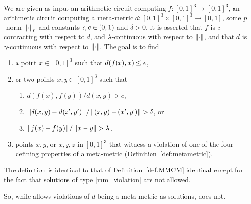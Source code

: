 \begin{definition}[\MMCM]
\label{def:MMCM}
We are given as input an arithmetic circuit computing $f: [0,1]^3\to [0,1]^3$,
an arithmetic circuit computing a meta-metric $d : [0,1]^3\times [0,1]^3 \to
[0,1]$, some $p$-norm $\left\| \cdot \right\|_r$ and constants \mbox{$\epsilon,c \in (0,1)$}
and $\delta > 0$. It is asserted that $f$ is $c$-contracting with
respect to $d$, and $\lambda$-continuous with respect to $\left\| \cdot \right\|$, and
that $d$ is $\gamma$-continuous with respect to $\left\| \cdot \right\|$. The goal is
to find
\begin{enumerate}[label=(M\arabic*)]
\item a point $x\in [0,1]^3$ such that $d(f(x),x) \leq \epsilon$, \label{m_fixpoint}
\item or two points $x,y\in [0,1]^3$ such that \label{m_violation}
  \begin{enumerate}[label=(M\arabic{enumi}\alph*)]
    \item $d(f(x),f(y))/d(x,y) > c$, \label{m_not_contracting}
    \item $\left\| d(x,y) - d(x',y') \right\|/\left\| (x,y)-(x',y') \right\| > \delta$, or \label{m_bad_metametric}
    \item $\left\| f(x) - f(y) \right\|/\left\| x-y \right\| > \lambda$. \label{m_bad_f}
  \end{enumerate}
\item points $x,y$, or $x,y,z$ in $[0,1]^3$ that witness a violation of one 
	of the four defining properties of a meta-metric (Definition~\ref{def:metametric}). \label{mm_violation}
\end{enumerate}
\end{definition}

\begin{definition}[\GCM]
\label{def:GCM}
The definition is identical to that of Definition~\ref{def:MMCM} identical except for the fact that 
solutions of type \ref{mm_violation} are not allowed.
\end{definition}

So, while \MMCM allows violations of $d$ being a meta-metric
as solutions, \GCM does not. 

